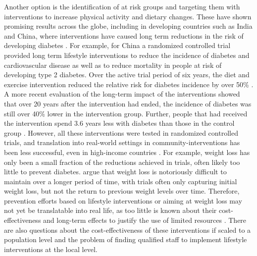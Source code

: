 Another option is the identification of at risk groups and targeting them with interventions to increase physical activity and dietary changes. These have shown promising results across the globe, including in developing countries such as India and China, where interventions have caused long term reductions in the risk of developing diabetes \parencite{Cefalu2016}. For example, for China a randomized controlled trial provided long term lifestyle interventions to reduce the incidence of diabetes and cardiovascular disease as well as to reduce mortality in people at risk of developing type 2 diabetes. Over the active trial period of six years, the diet and exercise intervention reduced the relative risk for diabetes incidence by  over 50\% \parencite{Pan1997}. A more recent evaluation of the long-term impact of the interventions showed that over 20 years after the intervention had ended, the incidence of diabetes was still over 40\% lower in the intervention group. Further, people that had received the intervention spend 3.6 years less with diabetes than those in the control group \parencite{Li2008}. However, all these interventions were tested in randomized controlled trials, and translation into real-world settings in community-interventions has been less successful, even in high-income countries \parencite{Wareham2016, Kahn2014}. For example, weight loss has only been a small fraction of the reductions achieved in trials, often likely too little to prevent diabetes. \textcite{Kahn2014} argue that weight loss is notoriously difficult to maintain over a longer period of time, with trials often only capturing initial weight loss, but not the return to previous weight levels over time.  Therefore, prevention efforts based on lifestyle interventions or aiming at weight loss may not yet be translatable into real life, as too little is known about their cost-effectiveness and long-term effects to justify the use of limited resources \parencite{Kahn2014}. There are also questions about the cost-effectiveness of these interventions if scaled to a population level and the problem of finding qualified staff to implement lifestyle interventions at the local level. 

